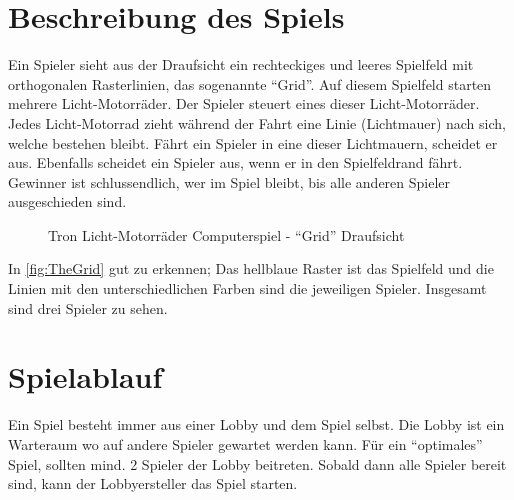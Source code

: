 \documentclass[11pt,ngerman]{article}
\newcommand{\quotes}[1]{``#1''}
\begin{document}
    \section{Beschreibung des Spiels}
    Ein Spieler sieht aus der Draufsicht ein rechteckiges und leeres Spielfeld mit orthogonalen Rasterlinien, das sogenannte \quotes{Grid}. Auf diesem Spielfeld starten mehrere Licht-Motorräder. Der Spieler steuert eines dieser Licht-Motorräder. Jedes Licht-Motorrad zieht während der Fahrt eine Linie (Lichtmauer) nach sich, welche bestehen bleibt. Fährt ein Spieler in eine dieser Lichtmauern, scheidet er aus. Ebenfalls scheidet ein Spieler aus, wenn er in den Spielfeldrand fährt. Gewinner ist schlussendlich, wer im Spiel bleibt, bis alle anderen Spieler ausgeschieden sind.

    \begin{figure}[H]
        \centering
        \caption{Tron Licht-Motorräder Computerspiel - \quotes{Grid} Draufsicht}
        \label{fig:TheGrid}
    \end{figure}

   \noindent In \autoref{fig:TheGrid} gut zu erkennen; Das hellblaue Raster ist das Spielfeld und die Linien mit den unterschiedlichen Farben sind die jeweiligen Spieler. Insgesamt sind drei Spieler zu sehen.

    \section{Spielablauf}
    Ein Spiel besteht immer aus einer Lobby und dem Spiel selbst. Die Lobby ist ein Warteraum wo auf andere Spieler gewartet werden kann. Für ein  \quotes{optimales} Spiel, sollten mind. 2 Spieler der Lobby beitreten. Sobald dann alle Spieler bereit sind, kann der Lobbyersteller das Spiel starten.
\end{document}
